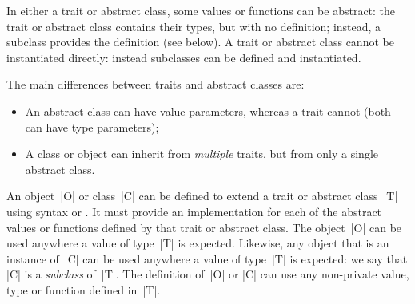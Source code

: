 


In either a trait or abstract class, some values or functions can be abstract:
the trait or abstract class contains their types, but with no definition;
instead, a subclass provides the definition (see below).
%
A trait or abstract class cannot be instantiated directly: instead subclasses
can be defined and instantiated.

The main differences between traits and  abstract classes are:
\begin{itemize}
\item An abstract class can have value parameters, whereas a trait cannot
  (both can have type parameters);

\item A class or object can inherit from \emph{multiple} traits, but from only
  a single abstract class.
\end{itemize}


An object~|O| or class~|C| can be defined to extend a trait or abstract
class~|T| using syntax
 or .
It must provide an implementation for each of the abstract values or functions
defined by that trait or abstract class.
%
The object~|O| can be used anywhere a value of type~|T| is expected.
Likewise, any object that is an instance of~|C| can be used anywhere a value
of type~|T| is expected: we say that |C| is a \emph{subclass} of~|T|.
%
The definition of~|O| or |C| can use any non-private value, type or function
defined in~|T|.

